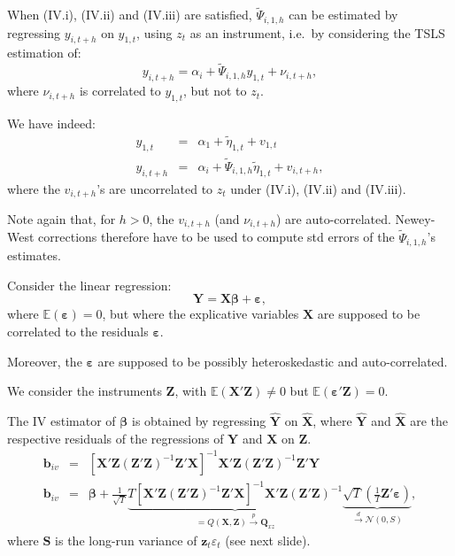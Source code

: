 \documentclass[
]{book}
\theoremstyle{definition}
\theoremstyle{definition}
\theoremstyle{definition}
\theoremstyle{definition}
\theoremstyle{remark}
\begin{document}
When (IV.i), (IV.ii) and (IV.iii) are satisfied, \(\tilde\Psi_{i,1,h}\) can be estimated by regressing \(y_{i,t+h}\) on \(y_{1,t}\), using \(z_t\) as an instrument, i.e.~by considering the TSLS estimation of:
\begin{equation}
y_{i,t+h} = \alpha_i + \tilde\Psi_{i,1,h}y_{1,t} + \nu_{i,t+h},\label{eq:regIV1}
\end{equation}
where \(\nu_{i,t+h}\) is correlated to \(y_{1,t}\), but not to \(z_t\).

We have indeed:
\begin{eqnarray*}
y_{1,t} &=& \alpha_1 + \tilde\eta_{1,t} + v_{1,t}\\
y_{i,t+h} &=& \alpha_i + \tilde\Psi_{i,1,h}\tilde\eta_{1,t} + v_{i,t+h},
\end{eqnarray*}
where the \(v_{i,t+h}\)'s are uncorrelated to \(z_t\) under (IV.i), (IV.ii) and (IV.iii).

Note again that, for \(h>0\), the \(v_{i,t+h}\) (and \(\nu_{i,t+h}\)) are auto-correlated. Newey-West corrections therefore have to be used to compute std errors of the \(\tilde\Psi_{i,1,h}\)'s estimates.

Consider the linear regression:
\[
\mathbf{Y} = \mathbf{X}\boldsymbol\beta + \boldsymbol\varepsilon,
\]
where \(\mathbb{E}(\boldsymbol\varepsilon)=0\), but where the explicative variables \(\mathbf{X}\) are supposed to be correlated to the residuals \(\boldsymbol\varepsilon\).

Moreover, the \(\boldsymbol\varepsilon\) are supposed to be possibly heteroskedastic and auto-correlated.

We consider the instruments \(\mathbf{Z}\), with \(\mathbb{E}(\mathbf{X}'\mathbf{Z}) \ne 0\) but \(\mathbb{E}(\boldsymbol\varepsilon'\mathbf{Z}) = 0\).

The IV estimator of \(\boldsymbol\beta\) is obtained by regressing \(\hat{\mathbf{Y}}\) on \(\hat{\mathbf{X}}\), where \(\hat{\mathbf{Y}}\) and \(\hat{\mathbf{X}}\) are the respective residuals of the regressions of \(\mathbf{Y}\) and \(\mathbf{X}\) on \(\mathbf{Z}\).
\begin{eqnarray*}
\mathbf{b}_{iv} &=& [\mathbf{X}'\mathbf{Z}(\mathbf{Z}'\mathbf{Z})^{-1}\mathbf{Z}'\mathbf{X}]^{-1}\mathbf{X}'\mathbf{Z}(\mathbf{Z}'\mathbf{Z})^{-1}\mathbf{Z}'\mathbf{Y}\\
\mathbf{b}_{iv} &=& \boldsymbol\beta + \frac{1}{\sqrt{T}}\underbrace{T[\mathbf{X}'\mathbf{Z}(\mathbf{Z}'\mathbf{Z})^{-1}\mathbf{Z}'\mathbf{X}]^{-1}\mathbf{X}'\mathbf{Z}(\mathbf{Z}'\mathbf{Z})^{-1}}_{=Q(\mathbf{X},\mathbf{Z}) \overset{p}{\rightarrow} \mathbf{Q}_{xz}}\underbrace{\sqrt{T}\left(\frac{1}{T}\mathbf{Z}'\boldsymbol\varepsilon\right)}_{\overset{d}{\rightarrow} \mathcal{N}(0,S)},
\end{eqnarray*}
where \(\mathbf{S}\) is the long-run variance of \(\mathbf{z}_t\varepsilon_t\) (see next slide).
\end{document}

